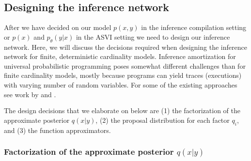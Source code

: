 \documentclass[12pt]{article}
\begin{document}
\subsection{Designing the inference network}
\label{sec:design}

After we have decided on our model $p(x,y)$ in the inference compilation setting or $p(x)$ and $p_\theta(y|x)$ in the ASVI setting we need to design our inference network. 
Here, we will discuss the decisions required when designing the inference network for finite, deterministic cardinality models.
Inference amortization for universal probabilistic programming poses somewhat different challenges than for finite cardinality models, mostly because programs can yield traces (executions) with varying number of random variables.
For some of the existing approaches see work by \citet{RitchieEtAl2016} and \citet{LeEtAl2016}.

The design decisions that we elaborate on below are
(1) the factorization of the approximate posterior $q(x|y)$, 
(2) the proposal distribution for each factor $q_i$, and
(3) the function approximators.


\subsubsection*{Factorization of the approximate posterior $q(x|y)$}
\end{document}
